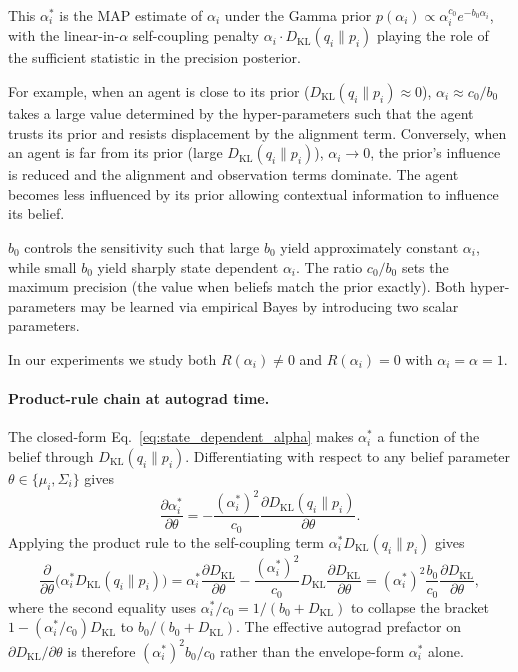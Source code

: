 \documentclass[twoside,11pt]{article}
\begin{document}
This $\alpha_i^*$ is the MAP estimate of $\alpha_i$ under the Gamma prior $p(\alpha_i) \propto \alpha_i^{c_0} e^{-b_0 \alpha_i}$, with the linear-in-$\alpha$ self-coupling penalty $\alpha_i \cdot D_{\mathrm{KL}}(q_i \| p_i)$ playing the role of the sufficient statistic in the precision posterior.

For example, when an agent is close to its prior ($D_{\mathrm{KL}}(q_i \| p_i) \approx 0$), $\alpha_i \approx c_0/b_0$ takes a large value determined by the hyper-parameters such that the agent trusts its prior and resists displacement by the alignment term. Conversely, when an agent is far from its prior (large $D_{\mathrm{KL}}(q_i \| p_i)$), $\alpha_i \to 0$, the prior's influence is reduced and the alignment and observation terms dominate. The agent becomes less influenced by its prior allowing contextual information to influence its belief.

$b_0$ controls the sensitivity such that large $b_0$ yield approximately constant $\alpha_i$, while small $b_0$ yield sharply state dependent $\alpha_i$. The ratio $c_0/b_0$ sets the maximum precision (the value when beliefs match the prior exactly). Both hyper-parameters may be learned via empirical Bayes by introducing two scalar parameters.

In our experiments we study both $R(\alpha_i) \neq 0$ and $R(\alpha_i) = 0$ with $\alpha_i = \alpha = 1$.

\paragraph{Product-rule chain at autograd time.}

The closed-form Eq.~\eqref{eq:state_dependent_alpha} makes $\alpha_i^*$ a function of the belief through $D_{\mathrm{KL}}(q_i \| p_i)$. Differentiating with respect to any belief parameter $\theta \in \{\mu_i, \Sigma_i\}$ gives
\begin{equation}
\frac{\partial \alpha_i^*}{\partial \theta} = -\frac{(\alpha_i^*)^2}{c_0} \frac{\partial D_{\mathrm{KL}}(q_i \| p_i)}{\partial \theta}.
\label{eq:alpha_chain_rule}
\end{equation}
Applying the product rule to the self-coupling term $\alpha_i^* D_{\mathrm{KL}}(q_i \| p_i)$ gives
\begin{equation}
\frac{\partial}{\partial \theta}\bigl(\alpha_i^* D_{\mathrm{KL}}(q_i \| p_i)\bigr) = \alpha_i^* \frac{\partial D_{\mathrm{KL}}}{\partial \theta} - \frac{(\alpha_i^*)^2}{c_0} D_{\mathrm{KL}} \frac{\partial D_{\mathrm{KL}}}{\partial \theta} = (\alpha_i^*)^2 \frac{b_0}{c_0} \frac{\partial D_{\mathrm{KL}}}{\partial \theta},
\label{eq:alpha_product_rule}
\end{equation}
where the second equality uses $\alpha_i^*/c_0 = 1/(b_0 + D_{\mathrm{KL}})$ to collapse the bracket $1 - (\alpha_i^*/c_0) D_{\mathrm{KL}}$ to $b_0/(b_0 + D_{\mathrm{KL}})$. The effective autograd prefactor on $\partial D_{\mathrm{KL}}/\partial \theta$ is therefore $(\alpha_i^*)^2 b_0/c_0$ rather than the envelope-form $\alpha_i^*$ alone.
\end{document}
